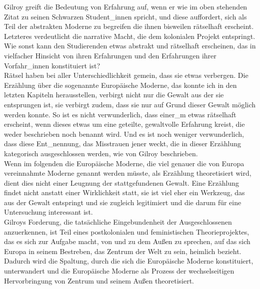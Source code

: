 Gilroy greift die Bedeutung von Erfahrung auf, wenn er wie im oben stehenden
Zitat zu seinen Schwarzen Student\_innen spricht, und diese auffordert, sich als
Teil der \glqq abstrakten Moderne\grqq\footnotemark {} zu begreifen die ihnen bisweilen \glqq rätselhaft\grqq\footnotemark {}
erscheint. Letzteres verdeutlicht die narrative Macht, die dem kolonialen
Projekt entspringt. Wie sonst kann den Studierenden etwas abstrakt und
rätselhaft erscheinen, das in vielfacher Hinsicht von ihren Erfahrungen und den
Erfahrungen ihrer Vorfahr\_innen konstituiert ist?\\ 
Rätsel haben bei aller Unterschiedlichkeit gemein, dass sie etwas verbergen.
Die Erzählung über die sogenannte Europäische Moderne, das konnte ich in den
letzten Kapiteln herausstellen, verbirgt nicht nur die Gewalt aus der sie
entsprungen ist, sie verbirgt zudem, dass sie nur auf Grund dieser Gewalt
möglich werden konnte. So ist es nicht verwunderlich, dass einer\_m etwas
rätselhaft erscheint, wenn dieses etwas um eine geteilte, gewaltvolle Erfahrung
kreist, die weder beschrieben noch benannt wird. Und es ist noch weniger
verwunderlich, dass diese Ent\_nennung, das Misstrauen jener weckt, die in
dieser Erzählung kategorisch ausgeschlossen werden, wie von Gilroy beschrieben.\\
Wenn im folgenden die Europäische Moderne, die viel genauer die von Europa
vereinnahmte Moderne genannt werden müsste, als Erzählung theoretisiert wird,
dient dies nicht einer Leugnung der stattgefundenen Gewalt. Eine Erzählung
findet nicht anstatt einer Wirklichkeit statt, sie ist viel eher ein Werkzeug,
das aus der Gewalt entspringt und sie zugleich legitimiert und die darum für
eine Untersuchung interessant ist.\footnotemark {}\\

\noindent Gilroys Forderung, die tatsächliche Eingebundenheit der Ausgeschlossenen
anzuerkennen, ist Teil eines postkolonialen und feministischen
Theorieprojektes, das es sich zur Aufgabe macht, von und zu dem Außen zu
sprechen, auf das sich Europa in seinem Bestreben, das Zentrum der Welt zu
sein, heimlich bezieht. \\
Dadurch wird die Spaltung, durch die sich die
Europäische Moderne konstituiert, unterwandert und die Europäische Moderne als
Prozess der wechselseitigen Hervorbringung von Zentrum und seinem Außen
theoretisiert.\\ 

